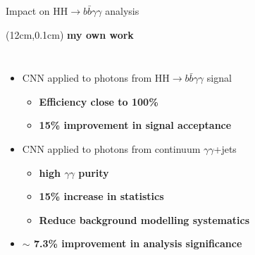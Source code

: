 \begin{frame}{Impact on HH$\to b\bar{b}\gamma\gamma$ analysis}
\begin{textblock*}{5cm}(12cm,0.1cm) %
   \textcolor{HHred}{\Large\textbf{my own work}}
\end{textblock*}
\begin{columns}
\begin{itemize}
    \item CNN applied to photons from HH$\to b\bar{b}\gamma\gamma$ signal
    \begin{itemize}
   
        \item \textcolor{HHturquoise_d}{\textbf{Efficiency close to 100\%}}
    
   
        \item \textbf{15\% improvement in signal acceptance}
    
    \end{itemize}
    
    \item CNN applied to photons from continuum $\gamma\gamma$+jets
    
    \begin{itemize}
    
        \item \textcolor{HHturquoise_m}{\textbf{high $\gamma\gamma$ purity}}
        \item \textbf{15\% increase in statistics}
        \item \textbf{Reduce background modelling systematics}
    
    \end{itemize}

    \item \textbf{\textcolor{HHred}{$\sim$ 7.3\%} improvement in analysis significance}
    
    
\end{itemize}


\end{columns}
\end{frame}

